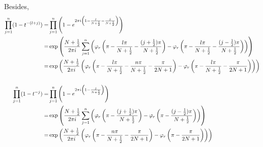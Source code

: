 \documentclass[10pt,a4paper]{article}
\newcommand{\lt}{\left}
\newcommand{\rt}{\right}
\begin{document}
Besides,
\begin{align}
 \prod_{j=1}^{n} (1-t^{-(l+j)})
=&\prod_{j=1}^n \lt(1 - e^{2\pi i \lt(1 - \frac{l}{N+\frac{1}{2}} - \frac{j}{N+\frac{1}{2}}\rt)}\rt)\notag \\
=&\exp\lt(\frac{N+\frac{1}{2}}{2\pi i}\sum_{j=1}^n \lt( \varphi_r \lt(\pi -\frac{l\pi}{N+\frac{1}{2}} - \frac{(j+\frac{1}{2})\pi}{N+\frac{1}{2}}\rt)  - \varphi_r\lt( \pi -\frac{l\pi}{N+\frac{1}{2}} - \frac{(j-\frac{1}{2})\pi}{N+\frac{1}{2}}\rt)  \rt) \rt)\notag \\
=&\exp\lt(\frac{N+\frac{1}{2}}{2\pi i}\lt( \varphi_r \lt(\pi-\frac{l\pi}{N+\frac{1}{2}} - \frac{n\pi}{N+\frac{1}{2}} - \frac{\pi}{2N+1}\rt)  - \varphi_r\lt( \pi -\frac{l\pi}{N+\frac{1}{2}}-\frac{\pi}{2N+1}\rt)   \rt)\rt)\label{t10}
\\ \notag\\
 \prod_{j=1}^{n} (1-t^{-j})
=&\prod_{j=1}^n \lt(1 - e^{2\pi i \lt(1 - \frac{j}{N+\frac{1}{2}}\rt)}\rt) \notag\\
=&\exp\lt(\frac{N+\frac{1}{2}}{2\pi i} \sum_{j=1}^n \lt( \varphi_r \lt(\pi -\frac{(j+\frac{1}{2})\pi}{N+\frac{1}{2}}\rt)  - \varphi_r\lt(\pi -\frac{(j-\frac{1}{2})\pi}{N+\frac{1}{2}}\rt)  \rt) \rt)\notag \\
=&\exp\lt(\frac{N+\frac{1}{2}}{2\pi i} \lt( \varphi_r\lt( \pi -\frac{n\pi}{N+\frac{1}{2}} - \frac{\pi}{2N+1}\rt) - \varphi_r \lt( \pi - \frac{\pi}{2N+1}\rt) \rt) \rt) \label{t11}
 \end{align}
 
\end{document}
